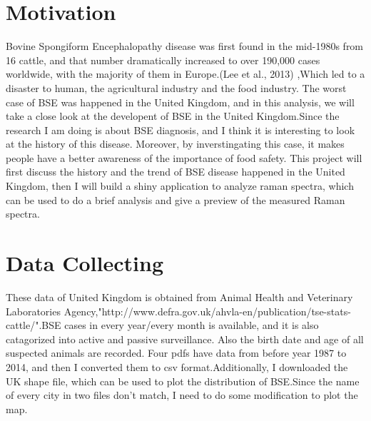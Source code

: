 \documentclass{article}\usepackage[]{graphicx}\usepackage[]{color}
\begin{document}
\section{Motivation}
\begin{enumerate}
    Bovine Spongiform Encephalopathy disease was first found in the mid-1980s from 16 cattle, and that number dramatically increased to over 190,000 cases worldwide, with the majority of them in Europe.(Lee et al., 2013) ,Which led to a disaster to human, the agricultural industry and the food industry. The worst case of BSE was happened in the United Kingdom, and in this analysis, we will take a close look at the developent of BSE in the United Kingdom.Since the research I am doing is about BSE diagnosis, and I think it is interesting to look at the history of this disease. Moreover, by inverstingating this case, it makes people have a better awareness of the importance of food safety.
    This project will first discuss the history and the trend of BSE disease happened in the United Kingdom, then I will build a shiny application to analyze raman spectra, which can be used to do a brief analysis and give a preview of the measured Raman spectra.
\end{enumerate}      
\section{Data Collecting}
\begin{enumerate}
    These data of United Kingdom is obtained from Animal Health and Veterinary Laboratories Agency,"http://www.defra.gov.uk/ahvla-en/publication/tse-stats-cattle/".BSE cases in every year/every month is available, and it is also catagorized into active and passive surveillance. Also the birth date and age of all suspected animals are recorded. Four pdfs have data from before year 1987 to 2014, and then I converted them to csv format.Additionally, I downloaded the UK shape file, which can be used to plot the distribution of BSE.Since the name of every city in two files don't match, I need to do some modification to plot the map.
\end{enumerate}    
\end{document}
